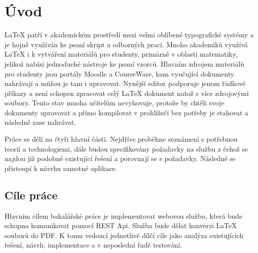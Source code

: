 \chapter{Úvod}
LaTeX patří v akademickém prostředí mezi velmi oblíbené typografické systémy a je hojně využíván ke psaní skript a odborných prací. Mnoho akademiků využívá LaTeX i k vytváření materiálů pro studenty, primárně v oblasti matematiky, jelikož nabízí jednoduché nástroje ke psaní vzorců. Hlavním zdrojem materiálů pro studenty jsou portály Moodle a CourseWare, kam vyučující dokumenty nahrávají a můžou je tam i upravovat. Nynější editor podporuje jenom řádkové příkazy a není schopen zpracovat celý LaTeX dokument natož s více zdrojovými soubory. Tento stav mnoha učitelům nevyhovuje, protože by chtěli svoje dokumenty upravovat a přímo kompilovat v prohlížeči bez potřeby je stahovat a následně zase nahrávat. 

Práce se dělí na čtyři hlavní části. Nejdříve proběhne seznámení s potřebnou teorií a technologiemi, dále budou specifikovány požadavky na službu z čehož se najdou již podobné existující řešení a porovnají se s požadavky. Následně se přistoupí k návrhu samotné aplikace.


\section{Cíle práce}
Hlavním cílem bakalářské práce je implementovat webovou službu, která bude schopna komunikovat pomocí REST Api. Služba bude dělat konverzi LaTeX souborů do PDF. K tomu vedoucí jednotlivé dílčí cíle jako analýza existujících řešení, návrh, implementace a v neposlední řadě testování. 